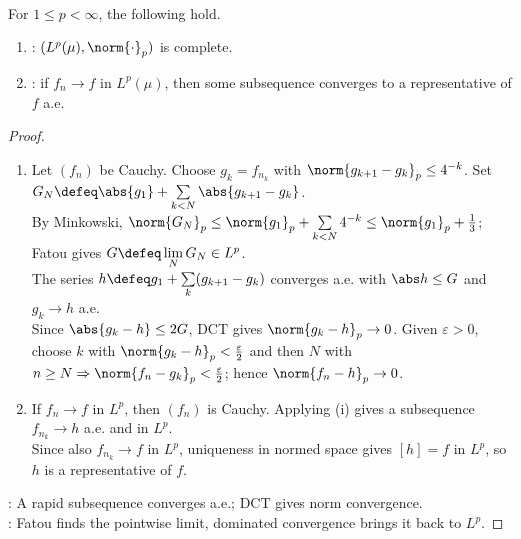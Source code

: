 \begin{theorem} \label{thm:riesz-fischer-lp-banach} \\
For $1\leq p<\infty$, the following hold.
\begin{enumerate}[label=(\roman*)]
\setlength{\itemsep}{0pt}
\item {}: $(L^p(\mu),\norm{\cdot}_p)$ is complete.
\item {}: if $f_n\to f$ in $L^p(\mu)$, then some subsequence converges to a representative of $f$ a.e.
\end{enumerate}
\begin{proof}
\begin{enumerate}[label=(\roman*)]
\setlength{\itemsep}{0pt}
\item Let $(f_n)$ be Cauchy. Choose $g_k=f_{n_k}$ with $\norm{g_{k+1}-g_k}_p\leq4^{-k}$. Set $G_N\defeq\abs{g_1}+\sum\limits_{k<N}\abs{g_{k+1}-g_k}$.\\
By Minkowski, $\norm{G_N}_p\leq\norm{g_1}_p+\sum\limits_{k<N}4^{-k}\leq\norm{g_1}_p+\frac{1}{3}$; Fatou gives $G\defeq\lim\limits_NG_N\in L^p$.\\
The series $h\defeq g_1+\sum\limits_k(g_{k+1}-g_k)$ converges a.e. with $\abs h\leq G$ and $g_k\to h$ a.e.\\
Since $\abs{g_k-h}\leq2G$, DCT gives $\norm{g_k-h}_p\to0$. Given $\varepsilon>0$, choose $k$ with $\norm{g_k-h}_p<\frac{\varepsilon}{2}$ and then $N$ with $n\geq N\Rightarrow\norm{f_n-g_k}_p<\frac{\varepsilon}{2}$; hence $\norm{f_n-h}_p\to0$.
\item If $f_n\to f$ in $L^p$, then $(f_n)$ is Cauchy. Applying (i) gives a subsequence $f_{n_k}\to h$ a.e. and in $L^p$.\\
Since also $f_{n_k}\to f$ in $L^p$, uniqueness in normed space gives $[h]=f$ in $L^p$, so $h$ is a representative of $f$.
\end{enumerate}
: A rapid subsequence converges a.e.; DCT gives norm convergence.\\
: Fatou finds the pointwise limit, dominated convergence brings it back to $L^p$.
\end{proof}
\end{theorem}

